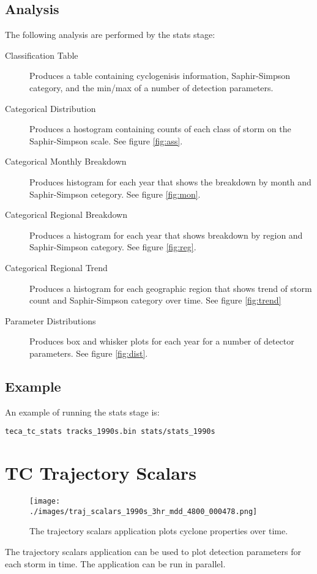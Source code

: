 \documentclass[a4paper,10pt,DIV=12]{scrreprt}
\begin{document}
\subsection{Analysis}
\noindent The following analysis are performed by the stats stage:
\begin{description}
\item[Classification Table] Produces a table containing cyclogenisis information, Saphir-Simpson category, and the min/max of a number of detection parameters.
\item[Categorical Distribution] Produces a hostogram containing counts of each class of storm on the Saphir-Simpson scale. See figure \ref{fig:ass}.
\item[Categorical Monthly Breakdown] Produces histogram for each year that shows the breakdown by month and Saphir-Simpson cetegory. See figure \ref{fig:mon}.
\item[Categorical Regional Breakdown] Produces a histogram for each year that shows breakdown by region and Saphir-Simpson category. See figure \ref{fig:reg}.
\item[Categorical Regional Trend] Produces a histogram for each geographic region that shows trend of storm count and Saphir-Simpson category over time. See figure \ref{fig:trend}
\item[Parameter Distributions] Produces box and whisker plots for each year for a number of detector parameters. See figure \ref{fig:dist}.
\end{description}

\subsection{Example}
\noindent An example of running the stats stage is:
\begin{verbatim}
teca_tc_stats tracks_1990s.bin stats/stats_1990s
\end{verbatim}

\section{TC Trajectory Scalars}
\begin{wrapfigure}{r}{0.4\textwidth}
 \centering
 \texttt{[image: ./images/traj\_scalars\_1990s\_3hr\_mdd\_4800\_000478.png]}
 \caption{The trajectory scalars application plots cyclone properties over time.}
 \label{fig:traj_scalar}
 \vspace{-110pt}
\end{wrapfigure}
The trajectory scalars application can be used to plot detection parameters for each storm in time. The application can be run in parallel.
\end{document}
